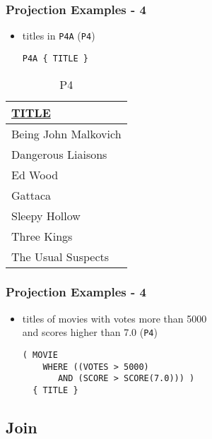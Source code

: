 \documentclass[dvipsnames]{beamer}
\theoremstyle{plain}
\begin{document}
\begin{frame}[fragile]
  \frametitle{Projection Examples - 4}

  \begin{itemize}
    \item titles in \texttt{P4A} (\texttt{P4})
    \begin{lstlisting}
P4A { TITLE }
    \end{lstlisting}
  \end{itemize}

  \vspace{-10pt}
  \begin{tiny}
  \begin{table}
    \caption{P4}
    \begin{tabular}{|l|}\hline
\underline{TITLE}   \\[2pt]\hline\hline
Being John Malkovich\\\hline
Dangerous Liaisons  \\\hline
Ed Wood             \\\hline
Gattaca             \\\hline
Sleepy Hollow       \\\hline
Three Kings         \\\hline
The Usual Suspects  \\\hline
    \end{tabular}
  \end{table}
  \end{tiny}
\end{frame}

\begin{frame}[fragile]
  \frametitle{Projection Examples - 4}

  \begin{itemize}
    \item titles of movies with votes more than 5000\\
      and scores higher than 7.0 (\texttt{P4})
    \begin{lstlisting}
( MOVIE
    WHERE ((VOTES > 5000)
       AND (SCORE > SCORE(7.0))) )
  { TITLE }
    \end{lstlisting}
  \end{itemize}
\end{frame}

\subsection{Join}
\end{document}

